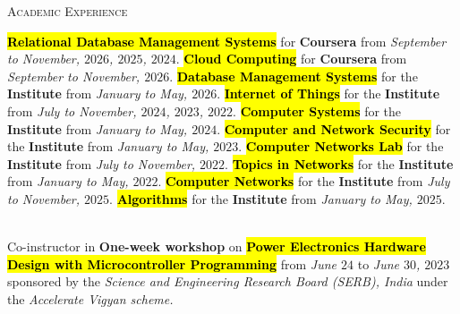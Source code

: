 \begin{rubric}{\textsc{Academic Experience}}


%
 \hl{\textbf{Relational Database Management Systems}} for \textbf{Coursera} from \textit{September to November, $2026$, $2025$, $2024$}.
%
 \hl{\textbf{Cloud Computing}} for \textbf{Coursera} from \textit{September to November, $2026$}.
%
 \hl{\textbf{Database Management Systems}} for the \textbf{Institute} from \textit{January to May, $2026$}.
%
 \hl{\textbf{Internet of Things}} for the \textbf{Institute} from \textit{July to November, $2024$, $2023$, $2022$}.
%
 \hl{\textbf{Computer Systems}} for the \textbf{Institute} from \textit{January to May, $2024$}.
%
 \hl{\textbf{Computer and Network Security}} for the \textbf{Institute} from \textit{January to May, $2023$}.
%
 \hl{\textbf{Computer Networks Lab}} for the \textbf{Institute} from \textit{July to November, $2022$}.
%
 \hl{\textbf{Topics in Networks}} for the \textbf{Institute} from \textit{January to May, $2022$}.
%
 \hl{\textbf{Computer Networks}} for the \textbf{Institute} from \textit{July to November, $2025$}.
%
 \hl{\textbf{Algorithms}} for the \textbf{Institute} from \textit{January to May, $2025$}.
%

\\
%
 Co-instructor in \textbf{One-week workshop} on \hl{\textbf{Power Electronics Hardware Design with Microcontroller Programming}} from \emph{June $24$} to \emph{June $30$, $2023$} sponsored by the \emph{Science and Engineering Research Board (SERB), India} under the \emph{Accelerate Vigyan scheme.}
%
\end{rubric}